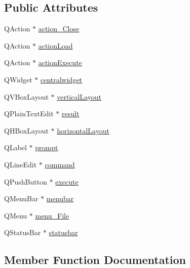 \subsection*{Public Attributes}
\begin{DoxyCompactItemize}
\item 
Q\+Action $\ast$ \mbox{\hyperlink{class_ui___r_console_a9e3d3ed4bf54512777f789cbb07904d2}{action\+\_\+\+Close}}
\item 
Q\+Action $\ast$ \mbox{\hyperlink{class_ui___r_console_a0d573776794ac305b3e1810141cf35e8}{action\+Load}}
\item 
Q\+Action $\ast$ \mbox{\hyperlink{class_ui___r_console_af98f519656368c4ee9e8494885ff3e92}{action\+Execute}}
\item 
Q\+Widget $\ast$ \mbox{\hyperlink{class_ui___r_console_a21bc34b62a81f6df07a9ae37719c20d3}{centralwidget}}
\item 
Q\+V\+Box\+Layout $\ast$ \mbox{\hyperlink{class_ui___r_console_a614984a847fea3971e7c7239557534c0}{vertical\+Layout}}
\item 
Q\+Plain\+Text\+Edit $\ast$ \mbox{\hyperlink{class_ui___r_console_aa3292cf361afe6b662e1568a7084ba04}{result}}
\item 
Q\+H\+Box\+Layout $\ast$ \mbox{\hyperlink{class_ui___r_console_af6ea9f7bc85293985a5d71dcbe2bbcfc}{horizontal\+Layout}}
\item 
Q\+Label $\ast$ \mbox{\hyperlink{class_ui___r_console_a3f650b6a000743c33bde7047d3bbc728}{prompt}}
\item 
Q\+Line\+Edit $\ast$ \mbox{\hyperlink{class_ui___r_console_a0d8f97f65910038f9595bf87fb169ff9}{command}}
\item 
Q\+Push\+Button $\ast$ \mbox{\hyperlink{class_ui___r_console_a230ab2f9372f60118bf33c5dd1785990}{execute}}
\item 
Q\+Menu\+Bar $\ast$ \mbox{\hyperlink{class_ui___r_console_a216c880326086ffcf6ff8325d8d638e0}{menubar}}
\item 
Q\+Menu $\ast$ \mbox{\hyperlink{class_ui___r_console_af65919f0f5e43c82638780f3f92aec9e}{menu\+\_\+\+File}}
\item 
Q\+Status\+Bar $\ast$ \mbox{\hyperlink{class_ui___r_console_a2dd945bda0c4118eee3665e3c2f6ba92}{statusbar}}
\end{DoxyCompactItemize}


\subsection{Member Function Documentation}
\mbox{\label{class_ui___r_console_a1f0b0cbeabd273ef19d2b1326c27ed8e}} 
